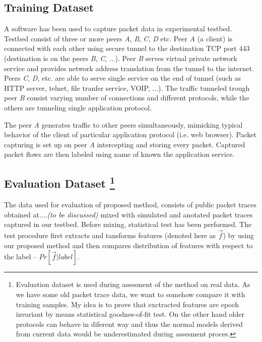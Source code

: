 \subsection{Training Dataset}

A  software \cite{jacobson2009tcpdump}  has been used to 
capture packet data in experimental testbed. 
Testbed consist of three or more peers \emph{A}, \emph{B}, \emph{C}, \emph{D}  etc. 
Peer \emph{A} (a client) is connected with each other using secure tunnel 
to the destination TCP port 443 (destination is on the peers \emph{B},  \emph{C}, ...).
Peer \emph{B} serves virtual private network service and provides network address
translation from the tunnel to the internet.
Peers \emph{C}, \emph{D}, etc. are able to serve single service on the end of tunnel 
(such as HTTP server, telnet, file tranfer service, VOIP, ...).
The traffic tunneled trough peer \emph{B} consist varying number of connections 
and different protocols,
while the others are tunneling single application protocol.

The peer \emph{A} generates traffic to other peers simultaneously, 
mimicking typical behavior of the client of particular application protocol 
(i.e. web browser).
Packet capturing is set up on peer \emph{A} intercepting and storing every packet.
Captured packet flows are then labeled using name of known the application service. 

\subsection{Evaluation Dataset%
\footnote{Evaluation dataset is used during 
assesment of the method on real data.
As we have some old packet trace data, we want to somehow compare it with training samples.
My idea is to prove that exctracted features are epoch invariant by means
statistical goodnes-of-fit test.
On the other hand older protocols can behave in diferent way and thus the 
normal models derived from current data would be
underestimated during assesment proces.
}%
}
The data used for evaluation of proposed method, consists of public packet
traces obtained at....\emph{(to be discussed)}
mixed with simulated and anotated packet traces captured in our testbed.
Before mixing, statistical test has been performed.
The test procedure first extracts and tansforms features
(denoted here as $\vec{f}$) by using our proposed method 
and then compares distribution of features with respect to 
the label -- $Pr\left[ \vec{f} | label \right] $.

